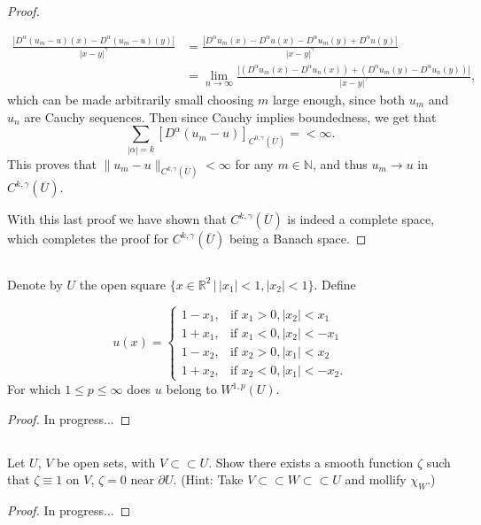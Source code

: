 \documentclass[11pt]{article}
\begin{document}
\begin{proof}
\begin{enumerate}[1.]
\begin{align*}
				\frac{|D^{\alpha}(u_m - u)(x) - D^{\alpha}(u_m-u)(y)|}{|x-y|^{\gamma}} &= \frac{|D^{\alpha}u_m(x) - D^{\alpha}u(x) - D^{\alpha}u_m(y) + D^{\alpha}u(y)|}{|x-y|^{\gamma}} \\
                                                                                                       &= \lim_{n \rightarrow \infty} \frac{|(D^{\alpha}u_m(x) - D^{\alpha}u_n(x)) +(D^{\alpha}u_m(y) - D^{\alpha}u_n(y))|}{|x-y|^{\gamma}},
			\end{align*}
			which can be made arbitrarily small choosing $m$ large enough, since both $u_m$ and $u_n$ are Cauchy sequences. Then since Cauchy implies boundedness, we get that
			\[\sum_{|\alpha| = k}[D^{\alpha}(u_m-u)]_{C^{0,\gamma}(\overline{U})} = < \infty.\]
			This proves that $\|u_m - u\|_{C^{k,\gamma}(\overline{U})} < \infty$ for any $m \in \mathbb{N}$, and thus $u_m \rightarrow u$ in $C^{k,\gamma}(\overline{U})$.
	\end{enumerate}
	With this last proof we have shown that $C^{k,\gamma}(\overline{U})$ is indeed a complete space, which completes the proof for $C^{k,\gamma}(\overline{U})$ being a Banach space.
\end{proof}

\newpage

\setcounter{subsection}{2}
\subsection{}
Denote by $U$ the open square $\{x \in \mathbb{R}^2 \, | \, |x_1| < 1, |x_2| < 1\}$. Define

\[
u(x) =
\begin{cases} 
	1 - x_1, & \text{if } x_1 > 0, |x_2| < x_1 \\
	1 + x_1, & \text{if } x_1 < 0, |x_2| < -x_1 \\
	1 - x_2, & \text{if } x_2 > 0, |x_1| < x_2 \\
	1 + x_2, & \text{if } x_2 < 0, |x_1| < -x_2.
\end{cases}
\]
For which $1 \leq p \leq \infty$ does $u$ belong to $W^{1,p}(U)$.
\begin{proof}
In progress...
\end{proof}

\setcounter{subsection}{4}
\subsection{}
Let $U$, $V$ be open sets, with $V\subset\subset U$. Show there exists a smooth function $\zeta$ such that
$\zeta \equiv 1$ on $V$, $\zeta = 0$ near $\partial U$. (Hint: Take $V \subset\subset W \subset\subset U$ and mollify $\chi_W$.)
\begin{proof}
In progress...
\end{proof}
\end{document}
